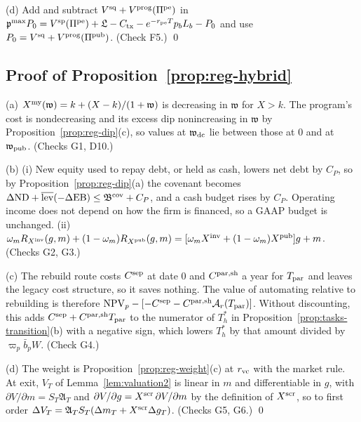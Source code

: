 (d) Add and subtract $V^{\rm sq}+V^{\rm prog}(\Pi^{\rm pe})$ in $\mathfrak p^{\max}P_0=V^{\rm sp}(\Pi^{\rm pe})+\mathfrak L-C_{\rm tx}-e^{-r_{\rm pe}T}p_bL_b-P_0$ and use $P_0=V^{\rm sq}+V^{\rm prog}(\Pi^{\rm pub})$. (Check F5.) \qed

\subsection*{Proof of Proposition~\ref{prop:reg-hybrid}}

(a) $X^{\rm my}(\mathfrak w)=k+(X-k)/(1+\mathfrak w)$ is decreasing in $\mathfrak w$ for $X>k$. The program's cost is nondecreasing and its excess dip nonincreasing in $\mathfrak w$ by Proposition~\ref{prop:reg-dip}(c), so values at $\mathfrak w_{\rm dc}$ lie between those at $0$ and at $\mathfrak w_{\rm pub}$. (Checks G1, D10.)

(b) (i) New equity used to repay debt, or held as cash, lowers net debt by $C_P$, so by Proposition~\ref{prop:reg-dip}(a) the covenant becomes $\Delta\mathrm{ND}+\overline{\rm lev}(-\Delta\mathrm{EB})\le\mathfrak B^{\rm cov}+C_P$, and a cash budget rises by $C_P$. Operating income does not depend on how the firm is financed, so a GAAP budget is unchanged. (ii) $\omega_mR_{X^{\rm inv}}(g,m)+(1-\omega_m)R_{X^{\rm pub}}(g,m)=[\omega_mX^{\rm inv}+(1-\omega_m)X^{\rm pub}]g+m$. (Checks G2, G3.)

(c) The rebuild route costs $C^{\rm sep}$ at date 0 and $C^{\rm par,sh}$ a year for $T_{\rm par}$ and leaves the legacy cost structure, so it saves nothing. The value of automating relative to rebuilding is therefore $\mathrm{NPV}_p-[-C^{\rm sep}-C^{\rm par,sh}\mathcal A_r(T_{\rm par})]$. Without discounting, this adds $C^{\rm sep}+C^{\rm par,sh}T_{\rm par}$ to the numerator of $T^*_h$ in Proposition~\ref{prop:tasks-transition}(b) with a negative sign, which lowers $T^*_h$ by that amount divided by $\varpi_p\bar b_pW$. (Check G4.)

(d) The weight is Proposition~\ref{prop:reg-weight}(c) at $r_{\rm vc}$ with the market rule. At exit, $V_T$ of Lemma~\ref{lem:valuation2} is linear in $m$ and differentiable in $g$, with $\partial V/\partial m=S_T\mathfrak A_T$ and $\partial V/\partial g=X^{\rm scr}\,\partial V/\partial m$ by the definition of $X^{\rm scr}$, so to first order $\Delta V_T=\mathfrak A_TS_T(\Delta m_T+X^{\rm scr}\Delta g_T)$. (Checks G5, G6.) \qed
